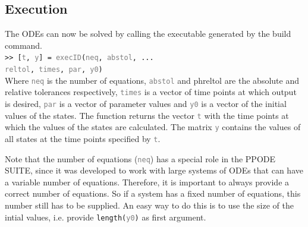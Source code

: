 \documentclass[a4paper,10pt,twocolumn]{article}
\newcommand{\PPODESUITE}{PPODE SUITE}
\newcommand{\matlabcmd}[1]{\\\indent\texttt{\footnotesize >> #1}\\}
\newcommand{\matlabcmdinline}[1]{\textacutedbl\texttt{\footnotesize#1}\textgravedbl}
\newcommand{\ph}[1]{\texttt{\footnotesize \textcolor{gray}{\textlangle #1\textrangle}}}
\begin{document}
\subsection*{Execution}
The ODEs can now be solved by calling the executable generated by the build command.
\matlabcmd{[\ph{t}, \ph{y}] = \ph{execID}(\ph{neq}, \ph{abstol}, ...\\ \ph{reltol}, \ph{times}, \ph{par}, \ph{y0})}
Where \ph{neq} is the number of equations, \ph{abstol} and ph{reltol} are the absolute and relative tolerances respectively, \ph{times} is a vector of time points at which output is desired, \ph{par} is a vector of parameter values and \ph{y0} is a vector of the initial values of the states. The function returns the vector \ph{t} with the time points at which the values of the states are calculated. The matrix \ph{y} contains the values of all states at the time points specified by \ph{t}.

Note that the number of equations (\ph{neq}) has a special role in the \PPODESUITE, since it was developed to work with large systems of ODEs that can have a variable number of equations. Therefore, it is important to always provide a correct number of equations. So if a system has a fixed number of equations, this number still has to be supplied. An easy way to do this is to use the size of the intial values, i.e. provide \matlabcmdinline{length(\ph{y0})} as first argument.
% 
\end{document}
